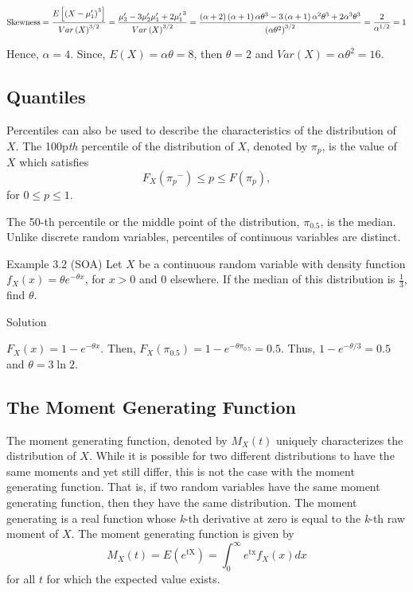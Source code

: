 \documentclass[]{book}
\begin{document}
\[\text{Skewness}  = \frac{E\left\lbrack {(X - \mu_{1}^{\prime})}^{3} \right\rbrack}{{Var\left( X \right)}^{3/2}} = \frac{\mu_{3}^{\prime} - 3\mu_{2}^{\prime}\mu_{1}^{\prime} + 2{\mu_{1}^{\prime}}^{3}}{{Var\left( X \right)}^{3/2}} \\
 = \frac{\left( \alpha + 2 \right)\left( \alpha + 1 \right)\alpha\theta^{3} - 3\left( \alpha + 1 \right)\alpha^{2}\theta^{3} + 2\alpha^{3}\theta^{3}}{\left( \alpha\theta^{2} \right)^{3/2}} = \frac{2}{\alpha^{1/2}} = 1\]

Hence, \(\alpha = 4\). Since, \(E\left( X \right) = \alpha\theta = 8\),
then \(\theta = 2\) and \(Var\left( X \right) = \alpha\theta^{2} = 16\).

\subsection{Quantiles}\label{quantiles}

Percentiles can also be used to describe the characteristics of the
distribution of \(X\). The 100p\emph{th} percentile of the distribution
of \(X\), denoted by \(\pi_{p}\), is the value of \(X\) which satisfies
\[F_{X}\left( {\pi_{p}}^{-} \right) \leq p \leq F\left( \pi_{p} \right) ,\]
for \(0 \leq p \leq 1\).

The 50-th percentile or the middle point of the distribution,
\(\pi_{0.5}\), is the median. Unlike discrete random variables,
percentiles of continuous variables are distinct.

Example 3.2 (SOA) Let \(X\) be a continuous random variable with density
function \(f_{X}\left( x \right) = \theta e^{- \theta x}\), for
\(x > 0\) and 0 elsewhere. If the median of this distribution is
\(\frac{1}{3}\), find \(\theta\).

Solution

\(F_{X}\left( x \right) = 1 - e^{- \theta x}\). Then,
\(F_{X}\left( \pi_{0.5} \right) = 1 - e^{- \theta\pi_{0.5}} = 0.5\).
Thus, \(1 - e^{-\theta / 3} = 0.5\) and \(\theta = 3 \ln 2\).

\subsection{The Moment Generating
Function}\label{the-moment-generating-function}

The moment generating function, denoted by \(M_{X}\left( t \right)\)
uniquely characterizes the distribution of \(X\). While it is possible
for two different distributions to have the same moments and yet still
differ, this is not the case with the moment generating function. That
is, if two random variables have the same moment generating function,
then they have the same distribution. The moment generating is a real
function whose \emph{k}-th derivative at zero is equal to the
\emph{k}-th raw moment of \(X\). The moment generating function is given
by
\[M_{X}\left( t \right) = E\left( e^{\text{tX}} \right) = \int_{0}^{\infty}{e^{\text{tx}}f_{X}\left( x \right) dx }\]
for all \(t\) for which the expected value exists.
\end{document}
